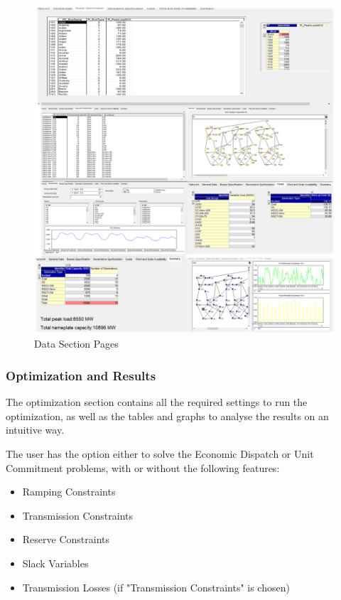\documentclass[12pt,LUDisStyle,twosided]{book}
\begin{document}
\begin{figure}[h] 
	\begin{center}
		\includegraphics[width=\textwidth,height=\textheight,keepaspectratio]{aimmsDataPages.png}
	  	\caption{Data Section Pages}
     	\label{fig:dataSectionPages}
	\end{center}
\end{figure}


\subsubsection{Optimization and Results}

The optimization section contains all the required settings to run the optimization, as well as the tables and graphs to analyse the results on an intuitive way. 

The user has the option either to solve the Economic Dispatch or Unit Commitment problems, with or without the following features:

\begin{itemize}
\item Ramping Constraints
\item Transmission Constraints
\item Reserve Constraints
\item Slack Variables
\item Transmission Losses (if "Transmission Constraints" is chosen)
\end{itemize}
\end{document}
